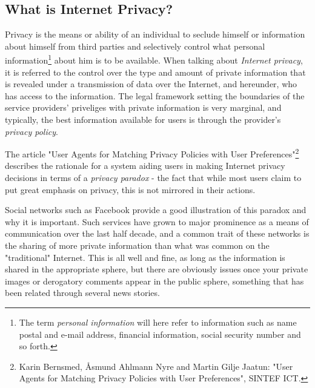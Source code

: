 \subsection{What is Internet Privacy?}
Privacy is the means or ability of an individual to seclude himself or information about himself from third parties and selectively control what personal information\footnote{The term \emph{personal information} will here refer to information such as name postal and e-mail address, financial information, social security number and so forth.} about him is to be available. When talking about \emph{Internet privacy}, it is referred to the control over the type and amount of private information that is revealed under a transmission of data over the Internet, and hereunder, who has access to the information. The legal framework setting the boundaries of the service providers' priveliges with private information is very marginal, and typically, the best information available for users is through the provider's \emph{privacy policy}.

The article "User Agents for Matching Privacy Policies with User Preferences"\footnote{Karin Bernsmed, {\AA}smund Ahlmann Nyre and Martin Gilje Jaatun: "User Agents for Matching Privacy Policies with User Preferences", SINTEF ICT.} describes the rationale for a system aiding users in making Internet privacy decisions in terms of a \emph{privacy paradox} - the fact that while most users claim to put great emphasis on privacy, this is not mirrored in their actions.

Social networks such as Facebook provide a good illustration of this paradox and why it is important. Such services have grown to major prominence as a means of communication over the last half decade, and a common trait of these networks is the sharing of more private information than what was common on the "traditional" Internet. This is all well and fine, as long as the information is shared in the appropriate sphere, but there are obviously issues once your private images or derogatory comments appear in the public sphere, something that has been related through several news stories. 


